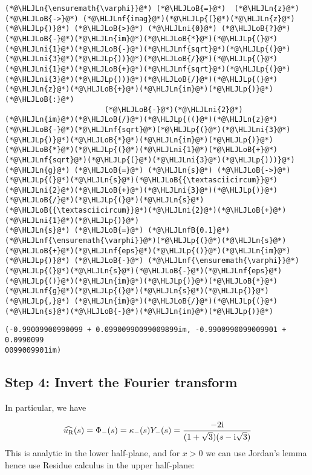 \documentclass[12pt,landscape]{article}
\newcommand{\HLJLn}[1]{#1}
\newcommand{\HLJLnf}[1]{\textcolor[RGB]{66,102,213}{#1}}
\newcommand{\HLJLnfB}[1]{\textcolor[RGB]{59,151,46}{#1}}
\newcommand{\HLJLni}[1]{\textcolor[RGB]{59,151,46}{#1}}
\newcommand{\HLJLoB}[1]{\textcolor[RGB]{102,102,102}{\textbf{#1}}}
\newcommand{\HLJLp}[1]{#1}
\def\I{ {\rm i} }
\begin{document}
{\begin{lstlisting}
(*@\HLJLn{\ensuremath{\varphi}}@*) (*@\HLJLoB{=}@*)  (*@\HLJLn{z}@*) (*@\HLJLoB{->}@*) (*@\HLJLnf{imag}@*)(*@\HLJLp{(}@*)(*@\HLJLn{z}@*)(*@\HLJLp{)}@*) (*@\HLJLoB{>}@*) (*@\HLJLni{0}@*) (*@\HLJLoB{?}@*) (*@\HLJLoB{-}@*)(*@\HLJLn{im}@*)(*@\HLJLoB{*}@*)(*@\HLJLp{(}@*)(*@\HLJLni{1}@*)(*@\HLJLoB{-}@*)(*@\HLJLnf{sqrt}@*)(*@\HLJLp{(}@*)(*@\HLJLni{3}@*)(*@\HLJLp{))}@*)(*@\HLJLoB{/}@*)(*@\HLJLp{(}@*)(*@\HLJLni{1}@*)(*@\HLJLoB{+}@*)(*@\HLJLnf{sqrt}@*)(*@\HLJLp{(}@*)(*@\HLJLni{3}@*)(*@\HLJLp{))}@*)(*@\HLJLoB{/}@*)(*@\HLJLp{(}@*)(*@\HLJLn{z}@*)(*@\HLJLoB{+}@*)(*@\HLJLn{im}@*)(*@\HLJLp{)}@*) (*@\HLJLoB{:}@*)
                       (*@\HLJLoB{-}@*)(*@\HLJLni{2}@*)(*@\HLJLn{im}@*)(*@\HLJLoB{/}@*)(*@\HLJLp{((}@*)(*@\HLJLn{z}@*)(*@\HLJLoB{-}@*)(*@\HLJLnf{sqrt}@*)(*@\HLJLp{(}@*)(*@\HLJLni{3}@*)(*@\HLJLp{)}@*)(*@\HLJLoB{*}@*)(*@\HLJLn{im}@*)(*@\HLJLp{)}@*)(*@\HLJLoB{*}@*)(*@\HLJLp{(}@*)(*@\HLJLni{1}@*)(*@\HLJLoB{+}@*)(*@\HLJLnf{sqrt}@*)(*@\HLJLp{(}@*)(*@\HLJLni{3}@*)(*@\HLJLp{)))}@*)
(*@\HLJLn{g}@*) (*@\HLJLoB{=}@*) (*@\HLJLn{s}@*) (*@\HLJLoB{->}@*) (*@\HLJLp{(}@*)(*@\HLJLn{s}@*)(*@\HLJLoB{{\textasciicircum}}@*)(*@\HLJLni{2}@*)(*@\HLJLoB{+}@*)(*@\HLJLni{3}@*)(*@\HLJLp{)}@*)(*@\HLJLoB{/}@*)(*@\HLJLp{(}@*)(*@\HLJLn{s}@*)(*@\HLJLoB{{\textasciicircum}}@*)(*@\HLJLni{2}@*)(*@\HLJLoB{+}@*)(*@\HLJLni{1}@*)(*@\HLJLp{)}@*)
(*@\HLJLn{s}@*) (*@\HLJLoB{=}@*) (*@\HLJLnfB{0.1}@*)
(*@\HLJLnf{\ensuremath{\varphi}}@*)(*@\HLJLp{(}@*)(*@\HLJLn{s}@*)(*@\HLJLoB{+}@*)(*@\HLJLnf{eps}@*)(*@\HLJLp{()}@*)(*@\HLJLn{im}@*)(*@\HLJLp{)}@*) (*@\HLJLoB{-}@*) (*@\HLJLnf{\ensuremath{\varphi}}@*)(*@\HLJLp{(}@*)(*@\HLJLn{s}@*)(*@\HLJLoB{-}@*)(*@\HLJLnf{eps}@*)(*@\HLJLp{()}@*)(*@\HLJLn{im}@*)(*@\HLJLp{)}@*)(*@\HLJLoB{*}@*)(*@\HLJLnf{g}@*)(*@\HLJLp{(}@*)(*@\HLJLn{s}@*)(*@\HLJLp{)}@*) (*@\HLJLp{,}@*) (*@\HLJLn{im}@*)(*@\HLJLoB{/}@*)(*@\HLJLp{(}@*)(*@\HLJLn{s}@*)(*@\HLJLoB{-}@*)(*@\HLJLn{im}@*)(*@\HLJLp{)}@*)
\end{lstlisting}

\begin{lstlisting}
(-0.99009900990099 + 0.09900990099009899im, -0.9900990099009901 + 0.0990099
0099009901im)
\end{lstlisting}


\subsection{Step 4: Invert the Fourier transform}
In particular, we have

\[
\widehat{u_{\rm R}}(s) = \Phi_-(s) = \kappa_-(s) Y_-(s) =  {-2 \I \over (1+\sqrt{3})(s-\I \sqrt 3)}
\]
This is analytic in the lower half-plane, and for $x > 0$ we can use Jordan's lemma hence use Residue calculus in the upper half-plane:


}
\end{document}
